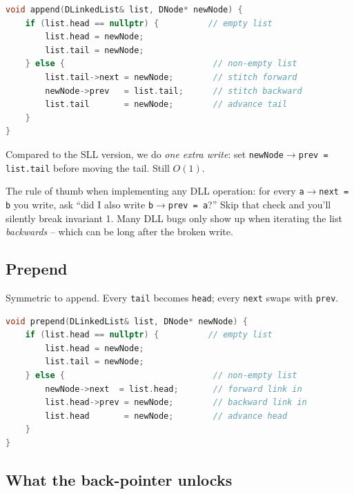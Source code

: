\documentclass[11pt]{article}
\begin{document}
\begin{examplebox}
\begin{lstlisting}[basicstyle=\ttfamily\small,frame=single,language=C++]
void append(DLinkedList& list, DNode* newNode) {
    if (list.head == nullptr) {          // empty list
        list.head = newNode;
        list.tail = newNode;
    } else {                              // non-empty list
        list.tail->next = newNode;        // stitch forward
        newNode->prev   = list.tail;      // stitch backward
        list.tail       = newNode;        // advance tail
    }
}
\end{lstlisting}
Compared to the SLL version, we do \emph{one extra write}: set
\texttt{newNode$\to$prev = list.tail} before moving the tail. Still
$O(1)$.
\end{examplebox}

\begin{warnbox}
The rule of thumb when implementing any DLL operation: for every
\texttt{a$\to$next = b} you write, ask ``did I also write
\texttt{b$\to$prev = a}?'' Skip that check and you'll silently break
invariant 1. Many DLL bugs only show up when iterating the list
\emph{backwards} -- which can be long after the broken write.
\end{warnbox}

\subsection{Prepend}

Symmetric to append. Every \texttt{tail} becomes \texttt{head};
every \texttt{next} swaps with \texttt{prev}.

\begin{examplebox}
\begin{lstlisting}[basicstyle=\ttfamily\small,frame=single,language=C++]
void prepend(DLinkedList& list, DNode* newNode) {
    if (list.head == nullptr) {          // empty list
        list.head = newNode;
        list.tail = newNode;
    } else {                              // non-empty list
        newNode->next  = list.head;       // forward link in
        list.head->prev = newNode;        // backward link in
        list.head       = newNode;        // advance head
    }
}
\end{lstlisting}
\end{examplebox}

\subsection{What the back-pointer unlocks}
\end{document}

